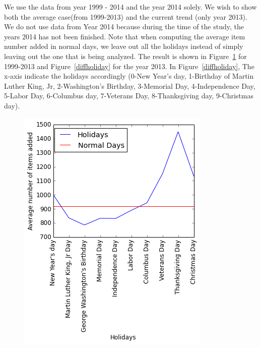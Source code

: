 We use the data from year 1999 - 2014 and the year 2014 solely. We wish to show both the average case(from 1999-2013) and the current trend (only year 2013). We do not use data from Year 2014 because during the time of the study, the years 2014 has not been finished. Note that when computing the average item number added in normal days, we leave out all the holidays instead of simply leaving out the one that is being analyzed. The result is shown in Figure~\ref{alldiffholiday} for 1999-2013 and Figure~\ref{diffholiday} for the year 2013. In Figure~\ref{diffholiday}, The x-axis indicate the holidays accordingly (0-New Year's day, 1-Birthday of Martin Luther King, Jr, 2-Washington's Birthday, 3-Memorial Day, 4-Independence Day, 5-Labor Day, 6-Columbus day, 7-Veterans Day, 8-Thanksgiving day, 9-Christmas day).


\begin{figure}[!h]
\centering
\begin{minipage}{.25\textwidth}
  \centering
  \includegraphics[width=.9\linewidth]{alldif.png}
  \label{alldiffholiday}
\end{minipage}%
\begin{minipage}{.25\textwidth}

\end{minipage}
\end{figure}
